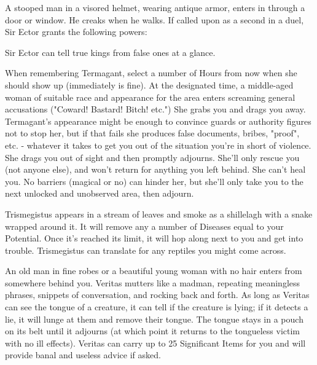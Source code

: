 
A stooped man in a visored helmet, wearing antique armor, enters in through a door or window.  He creaks when he walks.  If called upon as a second in a duel, Sir Ector grants the following powers:


Sir Ector can tell true kings from false ones at a glance.



When remembering Termagant, select a number of Hours from now when she should show up (immediately is fine).  At the designated time, a middle-aged woman of suitable race and appearance for the area enters screaming general accusations ("Coward!  Bastard!  Bitch!  etc.")  She grabs you and drags you away.  Termagant's appearance might be enough to convince guards or authority figures not to stop her, but if that fails she produces false documents, bribes, "proof", etc. - whatever it takes to get you out of the situation you're in short of violence.  She drags you out of sight and then promptly adjourns.  She'll only rescue you (not anyone else), and won't return for anything you left behind.  She can't heal you.  No barriers (magical or no) can hinder her, but she'll only take you to the next unlocked and unobserved area, then adjourn.


Trismegistus appears in a stream of leaves and smoke as a shillelagh with a snake wrapped around it.  It will remove any a number of Diseases equal to your Potential.  Once it's reached its limit, it will hop along next to you and get into trouble.  Trismegistus can translate for any reptiles you might come across.


An old man in fine robes or a beautiful young woman with no hair enters from somewhere behind you.  Veritas mutters like a madman, repeating meaningless phrases, snippets of conversation, and rocking back and forth.  As long as Veritas can see the tongue of a creature, it can tell if the creature is lying; if it detects a lie, it will lunge at them and remove their tongue.  The tongue stays in a pouch on its belt until it adjourns (at which point it returns to the tongueless victim with no ill effects).  Veritas can carry up to 25 Significant Items for you and will provide banal and useless advice if asked.


